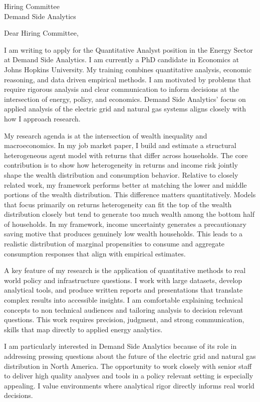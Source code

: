 \documentclass[11pt]{letter}
\begin{document}
\begin{letter}{Hiring Committee \\ Demand Side Analytics}

\opening{Dear Hiring Committee,}

I am writing to apply for the Quantitative Analyst position in the Energy Sector at Demand Side Analytics. I am currently a PhD candidate in Economics at Johns Hopkins University. My training combines quantitative analysis, economic reasoning, and data driven empirical methods. I am motivated by problems that require rigorous analysis and clear communication to inform decisions at the intersection of energy, policy, and economics. Demand Side Analytics’ focus on applied analysis of the electric grid and natural gas systems aligns closely with how I approach research.

My research agenda is at the intersection of wealth inequality and macroeconomics. In my job market paper, I build and estimate a structural heterogeneous agent model with returns that differ across households. The core contribution is to show how heterogeneity in returns and income risk jointly shape the wealth distribution and consumption behavior. Relative to closely related work, my framework performs better at matching the lower and middle portions of the wealth distribution. This difference matters quantitatively. Models that focus primarily on returns heterogeneity can fit the top of the wealth distribution closely but tend to generate too much wealth among the bottom half of households. In my framework, income uncertainty generates a precautionary saving motive that produces genuinely low wealth households. This leads to a realistic distribution of marginal propensities to consume and aggregate consumption responses that align with empirical estimates.

A key feature of my research is the application of quantitative methods to real world policy and infrastructure questions. I work with large datasets, develop analytical tools, and produce written reports and presentations that translate complex results into accessible insights. I am comfortable explaining technical concepts to non technical audiences and tailoring analysis to decision relevant questions. This work requires precision, judgment, and strong communication, skills that map directly to applied energy analytics.

I am particularly interested in Demand Side Analytics because of its role in addressing pressing questions about the future of the electric grid and natural gas distribution in North America. The opportunity to work closely with senior staff to deliver high quality analyses and tools in a policy relevant setting is especially appealing. I value environments where analytical rigor directly informs real world decisions.


\end{letter}
\end{document}
